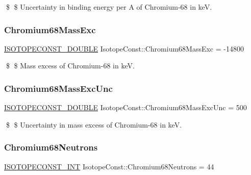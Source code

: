\$ \$ Uncertainty in binding energy per A of Chromium-\/68 in keV. \mbox{\label{group___isotope_const-_chromium-_cr68_gafe89a4365c059ca66027629ffa0ed454}} 
\subsubsection{\texorpdfstring{Chromium68\+Mass\+Exc}{Chromium68MassExc}}
{\footnotesize\ttfamily \mbox{\hyperlink{group___isotope_const-_macros_ga8f45a7272ce02c0b4c65c44636ed719a}{I\+S\+O\+T\+O\+P\+E\+C\+O\+N\+S\+T\+\_\+\+D\+O\+U\+B\+LE}} Isotope\+Const\+::\+Chromium68\+Mass\+Exc = -\/14800}

\$ \$ Mass excess of Chromium-\/68 in keV. \mbox{\label{group___isotope_const-_chromium-_cr68_ga4ecf962cb0f5ea9c91a762ccf3fa2b38}} 
\subsubsection{\texorpdfstring{Chromium68\+Mass\+Exc\+Unc}{Chromium68MassExcUnc}}
{\footnotesize\ttfamily \mbox{\hyperlink{group___isotope_const-_macros_ga8f45a7272ce02c0b4c65c44636ed719a}{I\+S\+O\+T\+O\+P\+E\+C\+O\+N\+S\+T\+\_\+\+D\+O\+U\+B\+LE}} Isotope\+Const\+::\+Chromium68\+Mass\+Exc\+Unc = 500}

\$ \$ Uncertainty in mass excess of Chromium-\/68 in keV. \mbox{\label{group___isotope_const-_chromium-_cr68_gaa2f89bb71f9af8ffb4f0e93fc584a21b}} 
\subsubsection{\texorpdfstring{Chromium68\+Neutrons}{Chromium68Neutrons}}
{\footnotesize\ttfamily \mbox{\hyperlink{group___isotope_const-_macros_ga5f18360b3e99483a35c32d789e62621c}{I\+S\+O\+T\+O\+P\+E\+C\+O\+N\+S\+T\+\_\+\+I\+NT}} Isotope\+Const\+::\+Chromium68\+Neutrons = 44}

